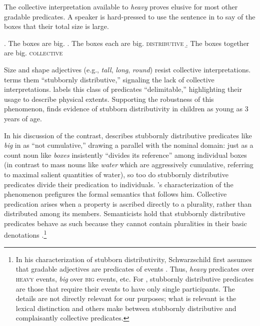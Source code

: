 \documentclass[linguex]{sp}
\begin{document}
The collective interpretation available to \emph{heavy} proves elusive for most other gradable predicates. A speaker is hard-pressed to use the sentence in \Next to say of the boxes that their total size is large.

\ex. The boxes are big.
\a. The boxes each are big. \hfill \textsc{distributive}
\b. The boxes together are big. \hfill {}\textsc{collective}

Size and shape adjectives (e.g., \emph{tall}, \emph{long}, \emph{round}) resist collective interpretations. \cite{schwarzschild2011} terms them ``stubbornly distributive,'' signaling the lack of collective interpretations. \citet{zhang2013} labels this class of predicates ``delimitable,'' highlighting their usage to describe physical extents. Supporting the robustness of this phenomenon, \cite{syrett2015} finds evidence of stubborn distributivity in children as young as 3 years of age.

In his discussion of the contrast, \citet{quine1960} describes stubbornly distributive predicates like \emph{big} in \Last as ``not cumulative,'' drawing a parallel with the nominal domain: just as a count noun like \emph{boxes} insistently ``divides its reference'' among individual boxes (in contrast to mass nouns like \emph{water} which are aggressively cumulative, referring to maximal salient quantities of water), so too do stubbornly distributive predicates divide their predication to individuals. \citeauthor{quine1960}'s characterization of the phenomenon prefigures the formal semantics that follows him. Collective predication arises when a property is ascribed directly to a plurality, rather than distributed among its members. Semanticists hold that stubbornly distributive predicates behave as such because they cannot contain pluralities in their basic denotations \citep{schwarzschild2011,vazquezrojas2012,zhang2013}.\footnote{In his characterization of stubborn distributivity, Schwarzschild first assumes that gradable adjectives are predicates of events \citep[e.g.,][]{higginbothamschein1989}. Thus, \emph{heavy} predicates over \textsc{heavy} events, \emph{big} over \textsc{big} events, etc. For \citeauthor{schwarzschild2011}, stubbornly distributive predicates are those that require their events to have only single participants. The details are not directly relevant for our purposes; what is relevant is the lexical distinction \citeauthor{schwarzschild2011} and others make between stubbornly distributive and complaisantly collective predicates.}
\end{document}
